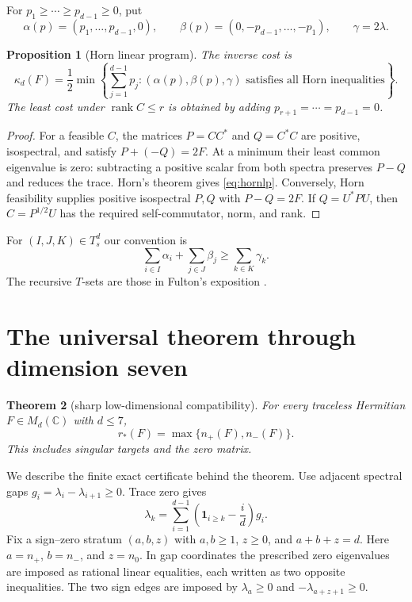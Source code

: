 \documentclass[11pt]{article}
\newtheorem{theorem}{Theorem}[section]
\newtheorem{proposition}[theorem]{Proposition}
\newcommand{\rank}{\operatorname{rank}}
\begin{document}
For $p_1\ge\cdots\ge p_{d-1}\ge0$, put
\[
 \alpha(p)=(p_1,\ldots,p_{d-1},0),\qquad
 \beta(p)=(0,-p_{d-1},\ldots,-p_1),\qquad \gamma=2\lambda.
\]

\begin{proposition}[Horn linear program]\label{prop:horn}
The inverse cost is
\begin{equation}
 \kappa_d(F)=\frac12\min\left\{\sum_{j=1}^{d-1}p_j:
 (\alpha(p),\beta(p),\gamma)\text{ satisfies all Horn inequalities}\right\}.
 \label{eq:hornlp}
\end{equation}
The least cost under $\rank C\le r$ is obtained by adding
$p_{r+1}=\cdots=p_{d-1}=0$.
\end{proposition}

\begin{proof}
For a feasible $C$, the matrices $P=CC^*$ and $Q=C^*C$ are positive,
isospectral, and satisfy $P+(-Q)=2F$.  At a minimum their least common
eigenvalue is zero: subtracting a positive scalar from both spectra preserves
$P-Q$ and reduces the trace.  Horn's theorem
\cite{horn1962,klyachko1998,knutson1999,fulton2000} gives
\eqref{eq:hornlp}.  Conversely, Horn feasibility supplies positive
isospectral $P,Q$ with $P-Q=2F$.  If $Q=U^*PU$, then $C=P^{1/2}U$ has the
required self-commutator, norm, and rank.
\end{proof}

For $(I,J,K)\in T_s^d$ our convention is
\begin{equation}
 \sum_{i\in I}\alpha_i+\sum_{j\in J}\beta_j
 \ge \sum_{k\in K}\gamma_k.
 \label{eq:horn}
\end{equation}
The recursive $T$-sets are those in Fulton's exposition \cite{fulton2000}.

\section{The universal theorem through dimension seven}

\begin{theorem}[sharp low-dimensional compatibility]\label{thm:threshold}
For every traceless Hermitian $F\in M_d(\mathbb C)$ with $d\le7$,
\begin{equation}
 r_*(F)=\max\{n_+(F),n_-(F)\}.
 \label{eq:compatibility}
\end{equation}
This includes singular targets and the zero matrix.
\end{theorem}

We describe the finite exact certificate behind the theorem.  Use adjacent
spectral gaps $g_i=\lambda_i-\lambda_{i+1}\ge0$.  Trace zero gives
\begin{equation}
 \lambda_k=\sum_{i=1}^{d-1}\left(\mathbf 1_{i\ge k}-\frac{i}{d}\right)g_i.
 \label{eq:gaps}
\end{equation}
Fix a sign--zero stratum $(a,b,z)$ with $a,b\ge1$, $z\ge0$, and
$a+b+z=d$.  Here $a=n_+$, $b=n_-$, and $z=n_0$.  In gap coordinates the
prescribed zero eigenvalues are imposed as rational linear equalities, each
written as two opposite inequalities.  The two sign edges are imposed by
$\lambda_a\ge0$ and $-\lambda_{a+z+1}\ge0$.
\end{document}
